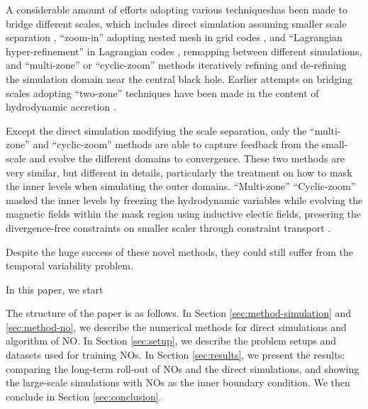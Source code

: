 \documentclass[%
 reprint,
 superscriptaddress,
 amsmath,amssymb,
 nofootinbib,
 prd,
]{revtex4-2}
\newcommand{\hywcom}[1]{{\color{purple}{[HYW: #1]}}}
\begin{document}
\hywcom{Black hole feeding and feedback problem.}
\hywcom{And Computational advances.}
A considerable amount of efforts adopting various techniqueshas been made to bridge different scales, 
which includes direct simulation assuming smaller scale separation \cite{Lalakos:2022qhl,Lalakos:2023ean,S:2023gta,Lalakos:2025msz},
``zoom-in'' adopting nested mesh in grid codes \cite{Guo2023,Guo2024}, and ``Lagrangian hyper-refinement'' in Lagrangian codes \cite{Hopkins:2023ipv,Hopkins2023},
remapping between different simulations, 
and ``multi-zone'' \cite{Cho:2023wqr,Cho:2024wsp,Cho:2025lzq} or ``cyclic-zoom'' \cite{Guo:2025sjb} methods iteratively 
refining and de-refining the simulation domain near the central black hole.
Earlier attempts on bridging scales adopting ``two-zone'' techniques have been made in the content of hydrodynamic accretion  \cite{Yuan:2012ApJ...761..129Y}.


\hywcom{Spatial-Temporal multiscale variability problem.}
Except the direct simulation modifying the scale separation, only the ``multi-zone'' and ``cyclic-zoom'' methods are able to capture feedback from the small-scale and evolve the different domains to convergence.
These two methods are very similar, but different in details, particularly the treatment on how to mask the inner levels when simulating the outer domains. 
``Multi-zone''
``Cyclic-zoom'' masked the inner levels by freezing the hydrodynamic variables while evolving the magnetic fields within the mask region using inductive electic fields, presering the divergence-free constraints on smaller scaler through constraint transport \cite{Balsara:1999JCoPh.149..270B,Gardiner2008}.

\hywcom{Temporal variability hierarchy.}
Despite the huge success of these novel methods, they could still suffer from the temporal variability problem.

\hywcom{Neural Operator}
In this paper, we start 

\hywcom{Paper Structure.}
The structure of the paper is as follows. 
\hywcom{multiscal-NO?}
In Section \ref{sec:method-simulation} and \ref{sec:method-no}, we describe the numerical methods for direct simulations and algorithm of NO.
In Section \ref{sec:setup}, we describe the problem setups and datasets used for training NOs.
In Section \ref{sec:results}, we present the results: comparing the long-term roll-out of NOs and the direct simulations, and showing the large-scale simulations with NOs as the inner boundary condition.
We then conclude in Section \ref{sec:conclusion}.
\end{document}
